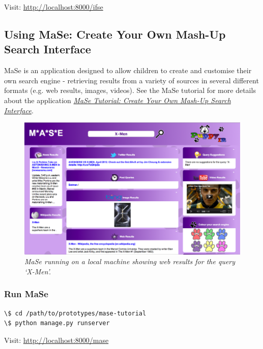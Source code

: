 \documentclass[letterpaper,10pt,english]{sphinxmanual}
\begin{document}
Visit: \href{http://localhost:8000/ifse}{http://localhost:8000/ifse}


\subsection{Using MaSe: Create Your Own Mash-Up Search Interface}
\label{prototypes:using-mase-create-your-own-mash-up-search-interface}
MaSe is an application designed to allow children to create and customise their own search engine - retrieving results from a variety of sources in several different formats (e.g. web results, images, videos). See the MaSe tutorial for more details about the application {\hyperref[mase-tutorial:mase-mash-up-search-engine-puppyir-tutorial]{\emph{MaSe Tutorial: Create Your Own Mash-Up Search Interface}}}.
\begin{figure}[htbp]
\centering
\capstart

\includegraphics{mase-7-all.png}
\caption{\emph{MaSe running on a local machine showing web results for the query `X-Men'.}}\end{figure}


\subsubsection{Run MaSe}
\label{prototypes:run-mase}
\begin{Verbatim}[commandchars=\\\{\}]
\$ cd /path/to/prototypes/mase-tutorial
\$ python manage.py runserver
\end{Verbatim}

Visit: \href{http://localhost:8000/mase}{http://localhost:8000/mase}
\end{document}
